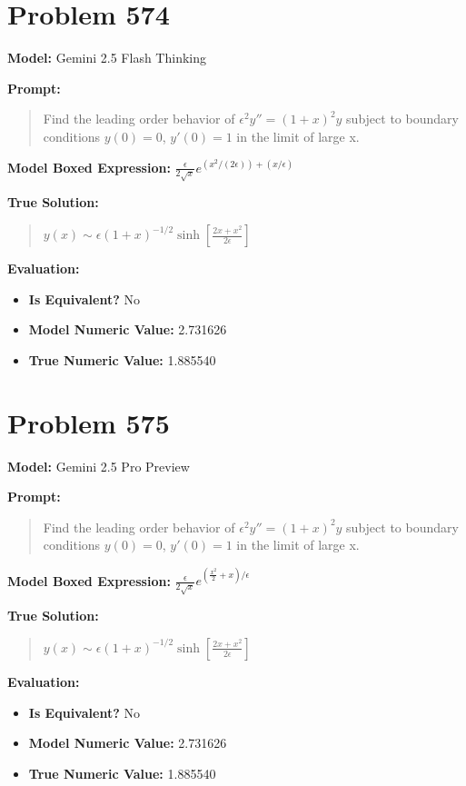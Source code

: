 \documentclass{article}
\begin{document}
\section*{Problem 574}
\textbf{Model:} Gemini 2.5 Flash Thinking

\textbf{Prompt:}
\begin{quote}
Find the leading order behavior of $\epsilon^2 y'' = (1+x)^2 y$ subject to boundary conditions $y(0) = 0$, $y'(0)= 1$ in the limit of large x.
\end{quote}
\textbf{Model Boxed Expression:} $\frac{\epsilon}{2\sqrt{x}} e^{(x^2/(2\epsilon)) + (x/\epsilon)}$

\textbf{True Solution:}
\begin{quote}
$y(x) \sim \epsilon (1+x)^{-1/2}\sinh[\frac{2x+x^2}{2\epsilon}]$
\end{quote}

\textbf{Evaluation:}
\begin{itemize}
\item \textbf{Is Equivalent?} No
\item \textbf{Model Numeric Value:} 2.731626
\item \textbf{True Numeric Value:} 1.885540
\end{itemize}
\vspace{1cm}
\section*{Problem 575}
\textbf{Model:} Gemini 2.5 Pro Preview

\textbf{Prompt:}
\begin{quote}
Find the leading order behavior of $\epsilon^2 y'' = (1+x)^2 y$ subject to boundary conditions $y(0) = 0$, $y'(0)= 1$ in the limit of large x.
\end{quote}
\textbf{Model Boxed Expression:} $\frac{\epsilon}{2\sqrt{x}} e^{\left(\frac{x^2}{2}+x\right)/\epsilon}$

\textbf{True Solution:}
\begin{quote}
$y(x) \sim \epsilon (1+x)^{-1/2}\sinh[\frac{2x+x^2}{2\epsilon}]$
\end{quote}

\textbf{Evaluation:}
\begin{itemize}
\item \textbf{Is Equivalent?} No
\item \textbf{Model Numeric Value:} 2.731626
\item \textbf{True Numeric Value:} 1.885540
\end{itemize}
\vspace{1cm}
\end{document}
